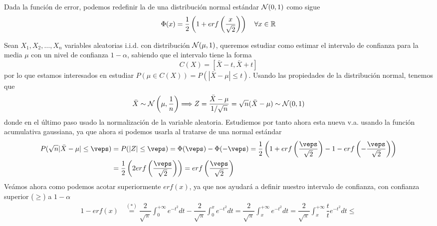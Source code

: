 \begin{observacion}
    Dada la función de error, podemos redefinir la  de una distribución normal estándar $\mathcal{N}(0,1)$ como sigue 
    \begin{equation*}
        \Phi(x) = \dfrac{1}{2} \left( 1 + erf\left(\dfrac{x}{\sqrt{2}}\right) \right) \quad \forall x \in \mathbb{R}
    \end{equation*}
\end{observacion}

\begin{ejemplo}
    Sean $X_1, X_2, \ldots, X_n$ variables aleatorias i.i.d. con distribución $\mathcal{N}(\mu, 1)$, queremos estudiar como estimar el intervalo de confianza para la media $\mu$ con un nivel de confianza $1-\alpha$, sabiendo que el intervalo tiene la forma 
    \begin{equation*}
        C(X)= \left[ \bar{X} - t, \bar{X} + t \right]
    \end{equation*}
    por lo que estamos interesados en estudiar $P(\mu \in C(X)) = P(|\bar{X}-\mu|\leq t)$. Usando las propiedades de la distribución normal, tenemos que
    \begin{equation*}
        \bar{X} \sim \mathcal{N}\left(\mu, \dfrac{1}{n}\right) \Longrightarrow Z = \dfrac{\bar{X} - \mu}{1/\sqrt{n}} = \sqrt{n}(\bar{X} - \mu) \sim \mathcal{N}(0,1)
    \end{equation*}
    donde en el último paso usado la normalización de la variable aleatoria. Estudiemos por tanto ahora esta nueva v.a. usando la función acumulativa gaussiana, ya que ahora si podemos usarla al tratarse de una normal estándar
    \begin{align*}
        P(\sqrt{n}|\bar{X} - \mu| \leq \veps) &= P(|Z|\leq \veps)=\Phi(\veps) - \Phi(-\veps) = \dfrac{1}{2} \left( 1 + erf\left(\dfrac{\veps}{\sqrt{2}}\right) -1 - erf\left(-\dfrac{\veps}{\sqrt{2}}\right) \right) \\
        & = \dfrac{1}{2} \left( 2erf\left(\dfrac{\veps}{\sqrt{2}}\right) \right) = erf\left(\dfrac{\veps}{\sqrt{2}}\right)
    \end{align*}
    Veámos ahora como podemos acotar superiormente $erf(x)$, ya que nos ayudará a definir nuestro intervalo de confianza, con confianza superior ($\geq$) a $1-\alpha$
    \begin{align}
        1-erf(x)&\overset{(*)}{=}\dfrac{2}{\sqrt{\pi}} \int_{0}^{+\infty} e^{-t^2} dt - \dfrac{2}{\sqrt{\pi}} \int_{0}^{x} e^{-t^2} dt = \dfrac{2}{\sqrt{\pi}} \int_{x}^{+\infty} e^{-t^2} dt  = \dfrac{2}{\sqrt{\pi}} \int_{x}^{+\infty} \dfrac{t}{t} e^{-t^2} dt \leq \\

\end{align}
\end{ejemplo}
